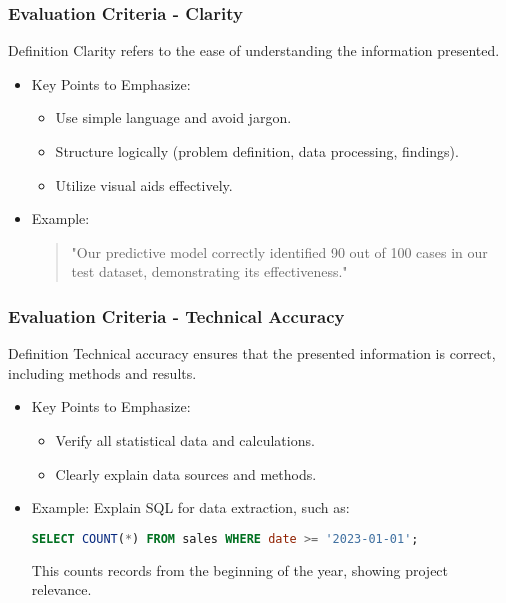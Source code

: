 \documentclass{beamer}
\begin{document}
\begin{frame}[fragile]
    \frametitle{Evaluation Criteria - Clarity}
    \begin{block}{Definition}
        Clarity refers to the ease of understanding the information presented.
    \end{block}
    \begin{itemize}
        \item Key Points to Emphasize:
        \begin{itemize}
            \item Use simple language and avoid jargon.
            \item Structure logically (problem definition, data processing, findings).
            \item Utilize visual aids effectively.
        \end{itemize}
        \item Example: 
        \begin{quote}
            "Our predictive model correctly identified 90 out of 100 cases in our test dataset, demonstrating its effectiveness."
        \end{quote}
    \end{itemize}
\end{frame}

\begin{frame}[fragile]
    \frametitle{Evaluation Criteria - Technical Accuracy}
    \begin{block}{Definition}
        Technical accuracy ensures that the presented information is correct, including methods and results.
    \end{block}
    \begin{itemize}
        \item Key Points to Emphasize:
        \begin{itemize}
            \item Verify all statistical data and calculations.
            \item Clearly explain data sources and methods.
        \end{itemize}
        \item Example: Explain SQL for data extraction, such as:
        \begin{lstlisting}[language=SQL]
        SELECT COUNT(*) FROM sales WHERE date >= '2023-01-01';
        \end{lstlisting}
        This counts records from the beginning of the year, showing project relevance.
    \end{itemize}
\end{frame}
\end{document}
